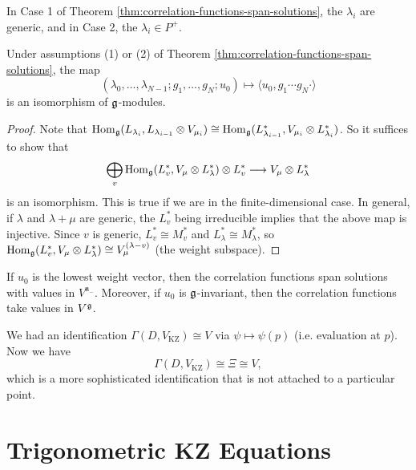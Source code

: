\begin{remark}
  In Case 1 of Theorem \ref{thm:correlation-functions-span-solutions},
  the $\lambda_i$ are generic, and in
  Case 2, the $\lambda_i \in P^+$.
\end{remark}

\begin{lemma}
  Under assumptions (1) or (2) of
  Theorem \ref{thm:correlation-functions-span-solutions},
  the map
  \[
    (\lambda_0, \dots, \lambda_{N - 1}; g_1, \dots, g_N; u_0)
    \longmapsto
    \langle u_0, g_1 \cdots g_N \cdot \rangle
  \]
  is an isomorphism of $\mathfrak{g}$-modules.
\end{lemma}

\begin{proof}
  Note that $\operatorname{Hom}_{\mathfrak{g}}(L_{\lambda_i}, L_{\lambda_{i - 1}} \otimes V_{\mu_i}) \cong \operatorname{Hom}_{\mathfrak{g}}(L_{\lambda_{i - 1}}^*, V_{\mu_i} \otimes L_{\lambda_i}^*)$.
  So it suffices to show that
  \[
    \bigoplus_v \operatorname{Hom}_{\mathfrak{g}}(L_v^*, V_\mu \otimes L_\lambda^*) \otimes L_v^*
    \longrightarrow
    V_\mu \otimes L_\lambda^*
  \]
  is an isomorphism. This is true if
  we are in the finite-dimensional case.
  In general, if $\lambda$ and $\lambda + \mu$
  are generic, the $L_v^*$ being
  irreducible implies that the above map
  is injective. Since $v$ is
  generic, $L_v^* \cong M_v^*$
  and $L_\lambda^* \cong M_\lambda^*$, so
  $\operatorname{Hom}_{\mathfrak{g}}(L_v^*, V_\mu \otimes L_\lambda^*) \cong V_\mu^{(\lambda - v)}$
  (the weight subspace).
\end{proof}

\begin{corollary}
  If $u_0$ is the lowest weight vector, then
  the correlation functions span solutions
  with values in $V^{\mathfrak{n}_-}$.
  Moreover, if $u_0$ is $\mathfrak{g}$-invariant,
  then the correlation functions take
  values in $V^{\mathfrak{g}}$.
\end{corollary}

\begin{remark}
  We had an identification
  $\Gamma(D, V_{\mathrm{KZ}}) \cong V$
  via $\psi \mapsto \psi(p)$
  (i.e. evaluation at $p$). Now we
  have
  \[
    \Gamma(D, V_{\mathrm{KZ}})
    \cong \Xi \cong V,
  \]
  which is a more sophisticated
  identification that is not attached to
  a particular point.
\end{remark}

\section{Trigonometric KZ Equations}

